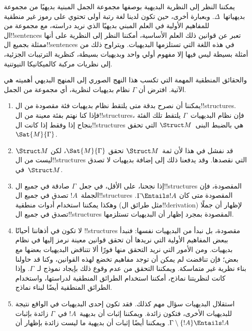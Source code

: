 \documentclass[../../../include/open-logic-section]{subfiles}
\begin{document}
\begin{explain}
يمكننا النظر إلى النظرية البديهية بوصفها مجموعة الجمل المبنية
بديهيًا من مجموعة بديهياتها~$\Delta$. وبعبارة أخرى، حين تكون لدينا لغة رتبة
أولى تحتوي على رموز غير منطقية للمفاهيم الأولية في العلم المبني
بديهيًا الذي نريد دراسته، مع مجموعة من ال!!{sentence}s تعبر عن
قوانين ذلك العلم الأساسية، أمكننا النظر إلى النظرية على أنها ممثلة
بجميع ال!!{sentence}s في هذه اللغة التي تستلزمها البديهيات. ويتراوح
ذلك من أمثلة بسيطة ليس فيها إلا مفهوم أولي واحد وبديهيات بسيطة،
كنظرية الترتيبات الجزئية، إلى نظريات مركبة كالميكانيكا النيوتنية.

والحقائق المنطقية المهمة التي تكسب هذا النهج الصوري إلى المنهج
البديهي أهميته هي الآتية. افترض أن $\Gamma$ نظام بديهيات لنظرية،
أي مجموعة من الجمل.
\begin{enumerate}
\item يمكننا أن نصرح بدقة متى يلتقط نظام بديهيات فئة مقصودة من
  ال!!{structure}s. فإذا كنا نهتم بفئة معينة من ال!!{structure}s،
  فإن نظام البديهيات~$\Gamma$ يلتقط تلك الفئة بنجاح إذا وفقط إذا
  كانت ال!!{structure}s هي بالضبط البنى~$\Struct M$ التي تحقق
  $\Sat{M}{\Gamma}$.
\item قد نفشل في هذا لأن ثمة~$\Struct M$ تحقق
  $\Sat{M}{\Gamma}$، لكن $\Struct M$ ليست من ال!!{structure}s
  التي نقصدها. وقد يدفعنا ذلك إلى إضافة بديهيات لا تصدق
  في~$\Struct M$.
\item إذا نجحنا، على الأقل، في جعل~$\Gamma$ صادقة في جميع
  ال!!{structure}s المقصودة، فإن الجملة~$!A$ تصدق في جميع
  ال!!{structure}s المقصودة متى كان $\Gamma \Entails !A$. وهكذا
  يمكننا استخدام أدوات منطقية (مثل طرائق ال!!{derivation}) لإظهار
  أن جملًا تصدق في جميع ال!!{structure}s المقصودة بمجرد إظهار أن
  البديهيات تستلزمها.
\item لا تكون في أذهاننا أحيانًا !!{structure}s مقصودة، بل نبدأ من
  البديهيات نفسها: فنبدأ ببعض المفاهيم الأولية التي نريدها أن تحقق
  قوانين معينة نرمز إليها في نظام بديهيات. ومن الأمور التي نريد
  التحقق منها فورًا ألا تتناقض البديهيات بعضها مع بعض؛ فإن تناقضت
  لم يمكن أن توجد مفاهيم تخضع لهذه القوانين، وكنا قد حاولنا بناء
  نظرية غير متماسكة. ويمكننا التحقق من عدم وقوع ذلك بإيجاد نموذج
  لـ~$\Gamma$. وإذا كانت لنظريتنا نماذج، أمكننا استخدام الطرائق
  المنطقية لدراستها، واستخدام الطرائق المنطقية أيضًا لبناء نماذج.
\item استقلال البديهيات سؤال مهم كذلك. فقد تكون إحدى البديهيات
  في الواقع نتيجة للبديهيات الأخرى، فتكون زائدة. ويمكننا إثبات أن
  بديهية~$!A$ في~$\Gamma$ زائدة بإثبات
  $\Gamma \setminus \{!A\} \Entails !A$. ويمكننا أيضًا إثبات أن
  بديهية ما ليست زائدة بإظهار أن

\end{enumerate}
\end{explain}
\end{document}
